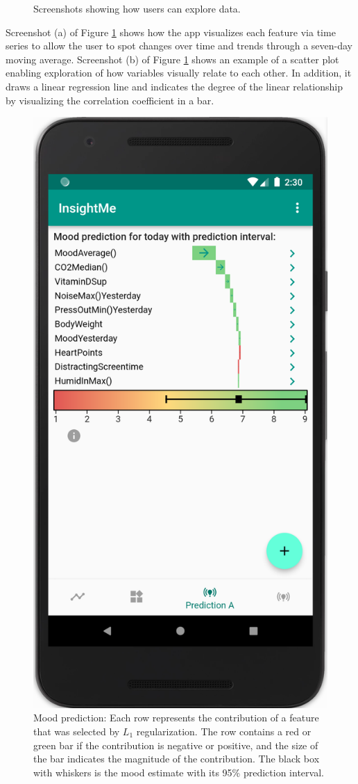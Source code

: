 \documentclass[conference]{IEEEtran}
\begin{document}
\begin{figure}[htbp]
{}
\caption{Screenshots showing how users can explore data.}
    \label{fig:plot}
\end{figure}

Screenshot (a) of Figure \ref{fig:plot} shows how the app visualizes each feature via time series to allow the user to spot changes over time and trends through a seven-day moving average.
Screenshot (b) of Figure \ref{fig:plot} shows an example of a scatter plot enabling exploration of how variables visually relate to each other. In addition, it draws a linear regression line and indicates the degree of the linear relationship by visualizing the correlation coefficient in a bar.

\begin{figure}[htbp]
    \centering
    \includegraphics[width=0.6\linewidth]{figs/waterfall.png}
    \caption{Mood prediction: Each row represents the contribution of a feature that was selected by $L_1$ regularization. The row contains a red or green bar if the contribution is negative or positive, and the size of the bar indicates the magnitude of the contribution.
    The black box with whiskers is the mood estimate with its 95\% prediction interval. 
    \label{fig:waterfall}
}
\end{figure}
\end{document}
